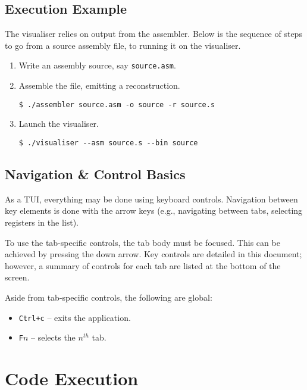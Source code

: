 \documentclass[10pt]{article}
\begin{document}
    \subsection{Execution Example}

    The visualiser relies on output from the assembler.
    Below is the sequence of steps to go from a source assembly file, to running it on the visualiser.
    \begin{enumerate}
        \item Write an assembly source, say \texttt{source.asm}.
        \item Assemble the file, emitting a reconstruction.
        \medskip
        \begin{lstlisting}[style=bashconsole]
$ ./assembler source.asm -o source -r source.s
        \end{lstlisting}
        \item Launch the visualiser.
        \medskip
        \begin{lstlisting}[style=bashconsole]
$ ./visualiser --asm source.s --bin source
        \end{lstlisting}
    \end{enumerate}

    \subsection{Navigation \& Control Basics}

    As a TUI, everything may be done using keyboard controls.
    Navigation between key elements is done with the arrow keys (e.g., navigating between tabs, selecting registers in the list).

    To use the tab-specific controls, the tab body must be focused.
    This can be achieved by pressing the down arrow.
    Key controls are detailed in this document; however, a summary of controls for each tab are listed at the bottom of the screen.

    Aside from tab-specific controls, the following are global:
    \begin{itemize}
        \item \texttt{Ctrl+c} -- exits the application.
        \item \texttt{F\(n\)} -- selects the \(n^{th}\) tab.
    \end{itemize}

    \section{Code Execution}
\end{document}
